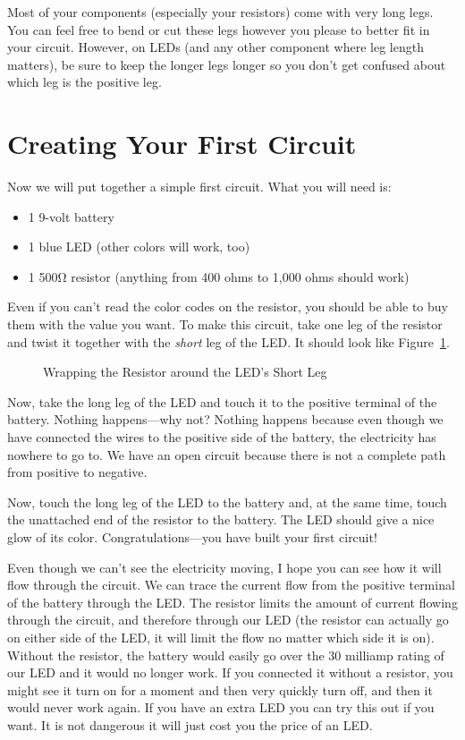 Most of your components (especially your resistors) come with very long legs.
You can feel free to bend or cut these legs however you please to better fit in your circuit.
However, on LEDs (and any other component where leg length matters), be sure to keep the longer legs longer so you don't get confused about which leg is the positive leg.

\section{Creating Your First Circuit}

Now we will put together a simple first circuit.
What you will need is:
\begin{itemize}
\item 1 9-volt battery
\item 1 blue LED (other colors will work, too)
\item 1 500\si{\ohm} resistor (anything from 400 ohms to 1,000 ohms should work)
\end{itemize}

Even if you can't read the color codes on the resistor, you should be able to buy them with the value you want.
To make this circuit, take one leg of the resistor and twist it together with the \emph{short} leg of the LED.
It should look like Figure~\ref{figLEDWrapped}.

\begin{figure}
\caption{Wrapping the Resistor around the LED's Short Leg}
\label{figLEDWrapped}
\end{figure}

Now, take the long leg of the LED and touch it to the positive terminal of the battery.
Nothing happens---why not?
Nothing happens because even though we have connected the wires to the positive side of the battery, the electricity has nowhere to go to.
We have an open circuit because there is not a complete path from positive to negative.

Now, touch the long leg of the LED to the battery and, at the same time, touch the unattached end of the resistor to the battery.
The LED should give a nice glow of its color.
Congratulations---you have built your first circuit!

Even though we can't see the electricity moving, I hope you can see how it will flow through the circuit.
We can trace the current flow from the positive terminal of the battery through the LED.
The resistor limits the amount of current flowing through the circuit, and therefore through our LED (the resistor can actually go on either side of the LED, it will limit the flow no matter which side it is on).
Without the resistor, the battery would easily go over the 30 milliamp rating of our LED and it would no longer work.  
If you connected it without a resistor, you might see it turn on for a moment and then very quickly turn off, and then it would never work again.
If you have an extra LED you can try this out if you want.
It is not dangerous it will just cost you the price of an LED.

